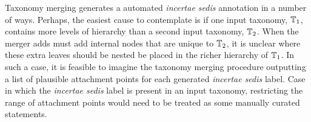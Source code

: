 \documentclass[english]{article}
\begin{document}
Taxonomy merging generates a automated \emph{incertae sedis} annotation
    in a number of ways.
Perhaps, the easiest cause to contemplate is if
one input taxonomy,
$\mbox{\ensuremath{\mathbb{T}}}_{1}$, contains more levels of hierarchy than a second
input taxonomy,
$\mbox{\ensuremath{\mathbb{T}}}_{2}$.
When the merger adds must add internal nodes that are unique to $\mbox{\ensuremath{\mathbb{T}}}_{2}$,
it is unclear where these
extra leaves should be nested be placed in the richer hierarchy of $\mbox{\ensuremath{\mathbb{T}}}_1$.
In such a case, it is feasible to imagine the taxonomy merging procedure outputting
    a list of plausible attachment points for each generated \emph{incertae sedis}
    label.
Case in which the \emph{incertae sedis} label is present in an input taxonomy,
    restricting the range of attachment points would need to be treated as
    some manually curated statements. 






\end{document}
